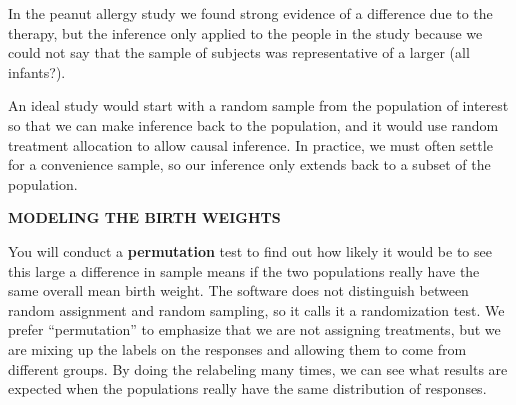 In the  peanut allergy study we found strong evidence of a
difference due to the therapy, but the inference only applied to the
people in the study because we could not say that the sample of
subjects was representative of a larger (all infants?). 

An ideal study would start with a random sample from the population of
interest so that we can make inference back to the population, and it
would use random treatment allocation to allow causal inference. In
practice, we must often settle for a convenience sample, so our
inference only extends back to a subset of the population.   


{\bf MODELING THE BIRTH WEIGHTS}

You will conduct a {\bf permutation} test to find out how likely it would
be to see this large a difference in sample means if the two
populations really have the same overall mean birth weight.  The software
does not distinguish between random assignment and 
random sampling, so it calls it a randomization test.  We prefer
``permutation'' to emphasize that we are not assigning treatments, but
we are mixing up the labels on the responses and allowing them to come from
different groups.  By doing the relabeling many times, we can see what
results are expected when the populations really have the same
distribution of responses. 

